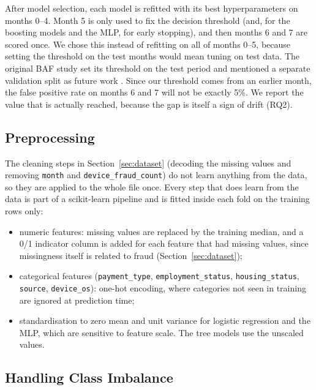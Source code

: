 

After model selection, each model is refitted with its best hyperparameters on months 0--4. Month 5
is only used to fix the decision threshold (and, for the boosting models and the MLP, for early
stopping), and then months 6 and 7 are scored once. We chose this instead of refitting on all of
months 0--5, because setting the threshold on the test months would mean tuning on test data. The
original BAF study set its threshold on the test period and mentioned a separate validation split as
future work \cite{jesus2022turning}. Since our threshold comes from an earlier month, the false
positive rate on months 6 and 7 will not be exactly 5\%. We report the value that is actually
reached, because the gap is itself a sign of drift (RQ2).

\subsection{Preprocessing}
\label{sec:method-prep}

The cleaning steps in Section~\ref{sec:dataset} (decoding the missing values and removing
\texttt{month} and \texttt{device\_fraud\_count}) do not learn anything from the data, so they are
applied to the whole file once. Every step that does learn from the data is part of a scikit-learn
pipeline \cite{pedregosa2011scikit} and is fitted inside each fold on the training rows only:
{\sloppy
\begin{itemize}
  \item numeric features: missing values are replaced by the training median, and a 0/1 indicator
        column is added for each feature that had missing values, since missingness itself is
        related to fraud (Section~\ref{sec:dataset});
  \item categorical features (\texttt{payment\_type}, \texttt{employment\_status},
        \texttt{housing\_status}, \texttt{source}, \texttt{device\_os}): one-hot encoding, where
        categories not seen in training are ignored at prediction time;
  \item standardisation to zero mean and unit variance for logistic regression and the MLP, which are
        sensitive to feature scale. The tree models use the unscaled values.
\end{itemize}
}

\subsection{Handling Class Imbalance}
\label{sec:method-imbalance}

